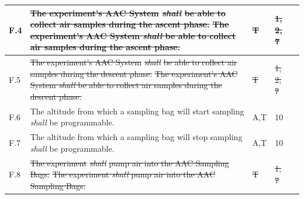 \documentclass[a4paper,12pt,twoside]{article}
\providecommand{\DIFaddtex}[1]{{\protect\color{blue}\uwave{#1}}} %
\providecommand{\DIFdeltex}[1]{{\protect\color{red}\sout{#1}}}                      %
\providecommand{\DIFaddbegin}{} %
\providecommand{\DIFaddend}{} %
\providecommand{\DIFdelbegin}{} %
\providecommand{\DIFdelend}{} %
\providecommand{\DIFadd}[1]{\texorpdfstring{\DIFaddtex{#1}}{#1}} %
\providecommand{\DIFdel}[1]{\texorpdfstring{\DIFdeltex{#1}}{}} %
\newcommand{\DIFscaledelfig}{0.5}
\newlength{\DIFdelgraphicswidth} %
\newlength{\DIFdelgraphicsheight} %
\newcommand{\DIFaddincludegraphics}[2][]{{\color{blue}\fbox{\DIFOincludegraphics[#1]{#2}}}} %
\newcommand{\DIFdelincludegraphics}[2][]{%
\sbox{\DIFdelgraphicsbox}{\DIFOincludegraphics[#1]{#2}}%
\settoboxwidth{\DIFdelgraphicswidth}{\DIFdelgraphicsbox} %
\settoboxtotalheight{\DIFdelgraphicsheight}{\DIFdelgraphicsbox} %
\scalebox{\DIFscaledelfig}{%
\parbox[b]{\DIFdelgraphicswidth}{\usebox{\DIFdelgraphicsbox}\\[-\baselineskip] \rule{\DIFdelgraphicswidth}{0em}}\llap{\resizebox{\DIFdelgraphicswidth}{\DIFdelgraphicsheight}{%
\setlength{\unitlength}{\DIFdelgraphicswidth}%
\begin{picture}(1,1)%
\thicklines\linethickness{2pt} %
{\color[rgb]{1,0,0}\put(0,0){\framebox(1,1){}}}%
{\color[rgb]{1,0,0}\put(0,0){\line( 1,1){1}}}%
{\color[rgb]{1,0,0}\put(0,1){\line(1,-1){1}}}%
\end{picture}%
}\hspace*{3pt}}} %
} %
\DeclareRobustCommand{\DIFaddbegin}{\DIFOaddbegin \let\includegraphics\DIFaddincludegraphics} %
\DeclareRobustCommand{\DIFaddend}{\DIFOaddend \let\includegraphics\DIFOincludegraphics} %
\DeclareRobustCommand{\DIFdelbegin}{\DIFOdelbegin \let\includegraphics\DIFdelincludegraphics} %
\DeclareRobustCommand{\DIFdelend}{\DIFOaddend \let\includegraphics\DIFOincludegraphics} %
\begin{document}
\begin{longtable}[]{|m{}| m{} |m{} |m{}|m{}|}
F.4  & \DIFdelbegin \DIFdel{The experiment's AAC System }\textit{\DIFdel{shall}} %
\DIFdel{be able to collect air samples during the ascent phase.                                                                               }\DIFdelend \DIFaddbegin \st{The experiment's AAC System \textit{shall} be able to collect air samples during the ascent phase.}\DIFadd{\textsuperscript{\ref{fn:unnecessary-requirement}}                                                                               }\DIFaddend &     \DIFdelbegin \DIFdel{T         }\DIFdelend \DIFaddbegin \DIFadd{-        }\DIFaddend & \DIFdelbegin \DIFdel{1, 2, 7     }\DIFdelend \DIFaddbegin \DIFadd{-     }\DIFaddend &        \\ \hline
F.5  & \DIFdelbegin \DIFdel{The experiment's AAC System }\textit{\DIFdel{shall}} %
\DIFdel{be able to collect air samples during the descent phase.                                                                              }\DIFdelend \DIFaddbegin \st{The experiment's AAC System \textit{shall} be able to collect air samples during the descent phase.}\DIFadd{\textsuperscript{\ref{fn:unnecessary-requirement}}                                                                               }\DIFaddend &      \DIFdelbegin \DIFdel{T        }\DIFdelend \DIFaddbegin \DIFadd{- }\DIFaddend & \DIFdelbegin \DIFdel{1, 2, 7    }\DIFdelend \DIFaddbegin \DIFadd{-    }\DIFaddend &        \\ \hline
F.6  & The altitude from which a sampling bag will start sampling \textit{shall} be programmable.                                                                                       &     A,T         &  10           &        \\ \hline
F.7  & The altitude from which a sampling bag will stop sampling \textit{shall} be programmable.                                                                                        &    A,T          & 10            &        \\ \hline
F.8  &\DIFdelbegin \DIFdel{The experiment }\textit{\DIFdel{shall}} %
\DIFdel{pump air into the AAC Sampling Bags.                                                                                                               }\DIFdelend \DIFaddbegin \st{The experiment \textit{shall} pump air into the AAC Sampling Bags.}\DIFadd{\textsuperscript{\ref{fn:unnecessary-requirement}}                                                                                                                }\DIFaddend &     \DIFdelbegin \DIFdel{T        }\DIFdelend \DIFaddbegin \DIFadd{-       }\DIFaddend & \DIFdelbegin \DIFdel{1, 7            }\DIFdelend \DIFaddbegin \DIFadd{-            }\DIFaddend &        \\ \hline

\end{longtable}
\end{document}
